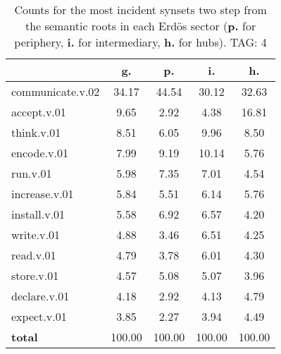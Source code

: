 \begin{table}[h!]
\begin{center}
\begin{tabular}{| l || c | c | c | c |}\hline
 & {\bf g.} & {\bf p.} & {\bf i.} & {\bf h.} \\\hline\hline
communicate.v.02 & 34.17  & 44.54  & 30.12  & 32.63 \\\hline
accept.v.01 & 9.65  & 2.92  & 4.38  & 16.81 \\\hline
think.v.01 & 8.51  & 6.05  & 9.96  & 8.50 \\\hline
encode.v.01 & 7.99  & 9.19  & 10.14  & 5.76 \\\hline
run.v.01 & 5.98  & 7.35  & 7.01  & 4.54 \\\hline
increase.v.01 & 5.84  & 5.51  & 6.14  & 5.76 \\\hline
install.v.01 & 5.58  & 6.92  & 6.57  & 4.20 \\\hline
write.v.01 & 4.88  & 3.46  & 6.51  & 4.25 \\\hline
read.v.01 & 4.79  & 3.78  & 6.01  & 4.30 \\\hline
store.v.01 & 4.57  & 5.08  & 5.07  & 3.96 \\\hline
declare.v.01 & 4.18  & 2.92  & 4.13  & 4.79 \\\hline
expect.v.01 & 3.85  & 2.27  & 3.94  & 4.49 \\\hline\hline
{{\bf total}} & 100.00  & 100.00  & 100.00  & 100.00 \\\hline
\end{tabular}
\caption{Counts for the most incident synsets two step from the semantic roots in each Erd\"os sector ({\bf p.} for periphery, {\bf i.} for intermediary, {\bf h.} for hubs). TAG: 4}
\end{center}
\end{table}